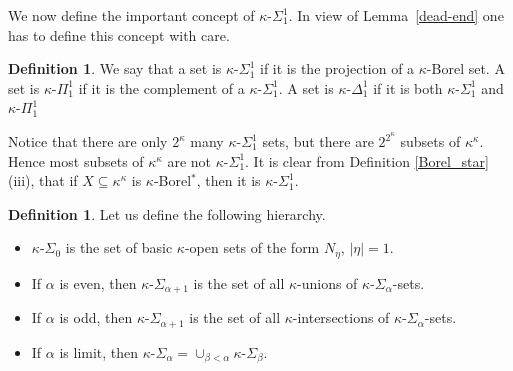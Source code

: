 \documentclass[12pt,a4paper]{amsart}
\theoremstyle{definition}
\newtheorem{defn}[thm]{Definition}
\theoremstyle{remark}
\renewcommand{\mid}{\mathrel{|}\allowbreak}
\def\borelstar{Borel\nobreak\hspace{1pt}$^*$}
\begin{document}
We now define the important concept of $\kappa$-$\Sigma^1_1$. In view of Lemma~\ref{dead-end} one has to define this concept with care.

\begin{defn}
We say that a set is $\kappa$-$\Sigma^1_1$ if it is the projection of a $\kappa$-Borel set. A set is $\kappa$-$\Pi^1_1$ if it is the complement of a $\kappa$-$\Sigma^1_1$. A set is $\kappa$-$\Delta^1_1$ if it is both $\kappa$-$\Sigma^1_1$  and $\kappa$-$\Pi^1_1$ 
\end{defn}

Notice that there are only $2^\kappa$ many $\kappa$-$\Sigma^1_1$ sets, but there are $2^{2^\kappa}$ subsets of $\kappa^\kappa$. Hence most subsets of $\kappa^\kappa$ are not $\kappa$-$\Sigma^1_1$.  It is clear from Definition \ref{Borel_star} (iii), that if $X\subseteq \kappa^\kappa$ is $\kappa$-\borelstar, then it is $\kappa$-$\Sigma_1^1$. 


\begin{defn}\label{Borel_hier2}
Let us define the following hierarchy.
\begin{itemize}
\item $\kappa$-$\Sigma_0$ is the set of basic $\kappa$-open sets of the form $N_{\eta}$, $|\eta|=1$.
\item If $\alpha$ is even, then $\kappa$-$\Sigma_{\alpha+1}$ is the set of all $\kappa$-unions of $\kappa$-$\Sigma_{\alpha}$-sets.
\item If $\alpha$ is odd, then $\kappa$-$\Sigma_{\alpha+1}$ is the set of all $\kappa$-intersections of $\kappa$-$\Sigma_{\alpha}$-sets.
\item If $\alpha$ is limit, then $\kappa$-$\Sigma_{\alpha}=\cup_{\beta<\alpha}\kappa\text{-}\Sigma_{\beta}$.
\end{itemize}
\end{defn}

\end{document}
